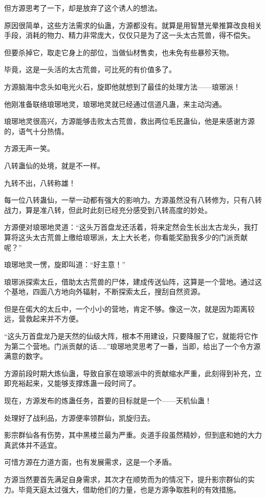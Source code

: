 \begin{this_body}
但方源思考了一下，却是放弃了这个诱人的想法。

原因很简单，这些方法需求的仙蛊，方源都没有。就算是用智慧光晕推算改良相关手段，消耗的物力、精力非常庞大，仅仅只是为了这一头太古荒兽，得不偿失。

但要杀掉它，取走它身上的部位，当做仙材售卖，也未免有些暴殄天物。

毕竟，这是一头活的太古荒兽，可比死的有价值多了。

方源脑海中念头如电光火石，旋即他就想到了最佳的处理方法——琅琊派！

他刚准备联络琅琊地灵，琅琊地灵就已经通过信道凡蛊，来主动沟通。

琅琊地灵很高兴，方源能够击败太古荒兽，救出两位毛民蛊仙，他是来感谢方源的，语气十分热情。

方源无声一笑。

八转蛊仙的处境，就是不一样。

九转不出，八转称雄！

每一位八转蛊仙，一举一动都有强大的影响力。方源虽然没有八转修为，只有八转战力，算是准八转，但此时此刻已经充分感受到八转高度的妙处。

方源便对琅琊地灵道：“这头万首盘龙还活着，将来定然会生长出太古龙头，我打算将这头太古荒兽上缴给琅琊派，太上大长老，你看能奖励我多少的门派贡献呢？”

琅琊地灵一愣，旋即叫道：“好主意！”

琅琊派探索太丘，借助太古荒兽的尸体，建成传送仙阵，这算是一个营地。通过这个基地，四面八方地向外辐射，不断探索太丘，搜刮自然资源。

但是在偌大的太丘中，一个小小的营地，肯定不够。像这一次，就是因为距离较远，营救起来并不方便。

“这头万首盘龙乃是天然的仙级大阵，根本不用建设，只要降服了它，就能将它作为第二个营地。门派贡献的话……”琅琊地灵思考了一番，当即，给出了一个令方源满意的数字。

方源前段时期大炼仙蛊，导致自家在琅琊派中的贡献缩水严重，此刻得到补充，立即充裕起来，又能够支撑炼蛊一段时间了。

现在，方源发布的炼蛊任务，首要的目标就是一个——天机仙蛊！

处理好了战利品，方源便率领群仙，凯旋归去。

影宗群仙各有伤势，其中黑楼兰最为严重。炎道手段虽然精妙，但到底和她的大力真武体并不适宜。

可惜方源在力道方面，也有发展需求，这是一个矛盾。

方源当然要首先满足自身需求，其次才在顺势而为的情况下，提升影宗群仙的实力。毕竟天庭太过强大，借助他们的力量，也是方源争取胜利的有效措施。


\end{this_body}
